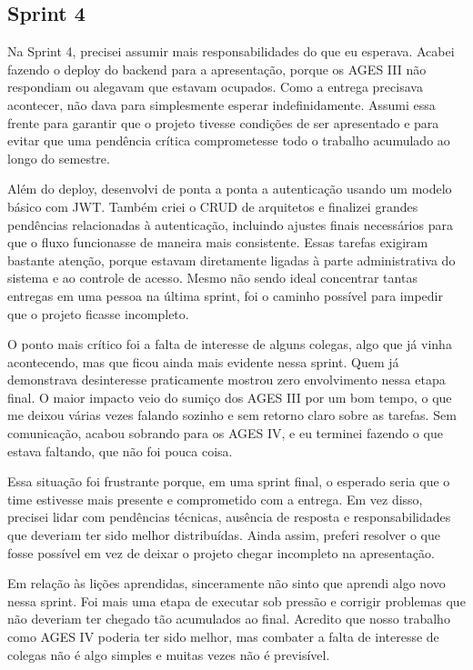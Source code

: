 \subsection{Sprint 4}

Na Sprint 4, precisei assumir mais responsabilidades do que eu esperava. Acabei fazendo o deploy do backend para a apresentação, porque os AGES III não respondiam ou alegavam que estavam ocupados. Como a entrega precisava acontecer, não dava para simplesmente esperar indefinidamente. Assumi essa frente para garantir que o projeto tivesse condições de ser apresentado e para evitar que uma pendência crítica comprometesse todo o trabalho acumulado ao longo do semestre.

Além do deploy, desenvolvi de ponta a ponta a autenticação usando um modelo básico com JWT. Também criei o CRUD de arquitetos e finalizei grandes pendências relacionadas à autenticação, incluindo ajustes finais necessários para que o fluxo funcionasse de maneira mais consistente. Essas tarefas exigiram bastante atenção, porque estavam diretamente ligadas à parte administrativa do sistema e ao controle de acesso. Mesmo não sendo ideal concentrar tantas entregas em uma pessoa na última sprint, foi o caminho possível para impedir que o projeto ficasse incompleto.

O ponto mais crítico foi a falta de interesse de alguns colegas, algo que já vinha acontecendo, mas que ficou ainda mais evidente nessa sprint. Quem já demonstrava desinteresse praticamente mostrou zero envolvimento nessa etapa final. O maior impacto veio do sumiço dos AGES III por um bom tempo, o que me deixou várias vezes falando sozinho e sem retorno claro sobre as tarefas. Sem comunicação, acabou sobrando para os AGES IV, e eu terminei fazendo o que estava faltando, que não foi pouca coisa.

Essa situação foi frustrante porque, em uma sprint final, o esperado seria que o time estivesse mais presente e comprometido com a entrega. Em vez disso, precisei lidar com pendências técnicas, ausência de resposta e responsabilidades que deveriam ter sido melhor distribuídas. Ainda assim, preferi resolver o que fosse possível em vez de deixar o projeto chegar incompleto na apresentação.

Em relação às lições aprendidas, sinceramente não sinto que aprendi algo novo nessa sprint. Foi mais uma etapa de executar sob pressão e corrigir problemas que não deveriam ter chegado tão acumulados ao final. Acredito que nosso trabalho como AGES IV poderia ter sido melhor, mas combater a falta de interesse de colegas não é algo simples e muitas vezes não é previsível.

